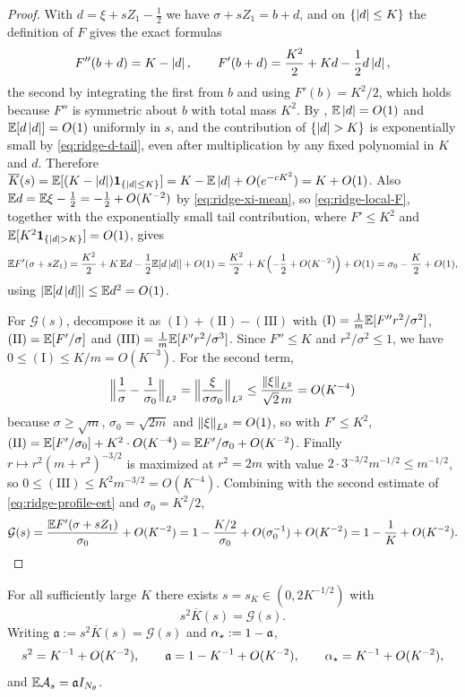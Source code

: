 \begin{proof}
With $d=\xi+sZ_1-\tfrac12$ we have $\sigma+sZ_1=b+d$, and on $\{\left\lvert d\right\rvert\leq K\}$ the definition
of $F$ gives the exact formulas
\begin{equation}
\label{eq:ridge-local-F}
    F''(b+d)=K-\left\lvert d\right\rvert,
    \qquad
    F'(b+d)=\frac{K^2}2+Kd-\frac12d\left\lvert d\right\rvert,
\end{equation}
the second by integrating the first from $b$ and using $F'(b)=K^2/2$, which holds because
$F''$ is symmetric about $b$ with total mass $K^2$. By ,
$\mathbb{E}\left\lvert d\right\rvert=O(1)$ and $\mathbb{E}[d\left\lvert d\right\rvert]=O(1)$ uniformly in $s$, and the contribution of
$\{\left\lvert d\right\rvert>K\}$ is exponentially small by \eqref{eq:ridge-d-tail}, even after multiplication by
any fixed polynomial in $K$ and $d$. Therefore
$\overline K(s)=\mathbb{E}[(K-\left\lvert d\right\rvert)\mathbf 1_{\{\left\lvert d\right\rvert\leq K\}}]=K-\mathbb{E}\left\lvert d\right\rvert+O(e^{-cK^2})=K+O(1)$. Also
$\mathbb{E} d=\mathbb{E}\xi-\tfrac12=-\tfrac12+O(K^{-2})$ by \eqref{eq:ridge-xi-mean}, so
\eqref{eq:ridge-local-F}, together with the exponentially small tail contribution, where
$F'\leq K^2$ and $\mathbb{E}[K^2\mathbf 1_{\{\left\lvert d\right\rvert>K\}}]=O(1)$, gives
\[
    \mathbb{E} F'(\sigma+sZ_1)
    =\frac{K^2}2+K\,\mathbb{E} d-\frac12\mathbb{E}[d\left\lvert d\right\rvert]+O(1)
    =\frac{K^2}2+K\Bigl(-\frac12+O(K^{-2})\Bigr)+O(1)
    =\sigma_0-\frac K2+O(1),
\]
using $\left\lvert \mathbb{E}[d\left\lvert d\right\rvert]\right\rvert\leq\mathbb{E} d^2=O(1)$.

For $\mathcal G(s)$, decompose it as $(\mathrm I)+(\mathrm{II})-(\mathrm{III})$ with
$(\mathrm I)=\tfrac1m\mathbb{E}[F''r^2/\sigma^2]$, $(\mathrm{II})=\mathbb{E}[F'/\sigma]$ and
$(\mathrm{III})=\tfrac1m\mathbb{E}[F'r^2/\sigma^3]$. Since $F''\leq K$ and $r^2/\sigma^2\leq1$, we have
$0\leq(\mathrm I)\leq K/m=O(K^{-3})$. For the second term,
\[
    \Bigl\|\frac1\sigma-\frac1{\sigma_0}\Bigr\|_{L^2}
    =\Bigl\|\frac\xi{\sigma\sigma_0}\Bigr\|_{L^2}
    \leq\frac{\left\lVert \xi\right\rVert_{L^2}}{\sqrt2\,m}=O(K^{-4})
\]
because $\sigma\geq\sqrt m$, $\sigma_0=\sqrt{2m}$ and $\left\lVert \xi\right\rVert_{L^2}=O(1)$, so with
$F'\leq K^2$,
$(\mathrm{II})=\mathbb{E}[F'/\sigma_0]+K^2\cdot O(K^{-4})=\mathbb{E} F'/\sigma_0+O(K^{-2})$. Finally
$r\mapsto r^2(m+r^2)^{-3/2}$ is maximized at $r^2=2m$ with value
$2\cdot3^{-3/2}m^{-1/2}\leq m^{-1/2}$, so $0\leq(\mathrm{III})\leq K^2m^{-3/2}=O(K^{-4})$.
Combining with the second estimate of \eqref{eq:ridge-profile-est} and $\sigma_0=K^2/2$,
\[
    \mathcal G(s)=\frac{\mathbb{E} F'(\sigma+sZ_1)}{\sigma_0}+O(K^{-2})
    =1-\frac{K/2}{\sigma_0}+O(\sigma_0^{-1})+O(K^{-2})
    =1-\frac1K+O(K^{-2}).\qedhere
\]
\end{proof}

\begin{lemma}
\label{lem:ridge-tuning}
For all sufficiently large $K$ there exists $s=s_K\in(0,2K^{-1/2})$ with
\begin{equation}
\label{eq:ridge-tuning}
    s^2\overline K(s)=\mathcal G(s).
\end{equation}
Writing $\mathfrak a:=s^2\overline K(s)=\mathcal G(s)$ and $\alpha_\star:=1-\mathfrak a$,
\begin{equation}
\label{eq:ridge-tuning-est}
    s^2=K^{-1}+O(K^{-2}),
    \qquad
    \mathfrak a=1-K^{-1}+O(K^{-2}),
    \qquad
    \alpha_\star=K^{-1}+O(K^{-2}),
\end{equation}
and $\mathbb{E}\mathcal A_s=\mathfrak aI_{N_\theta}$.
\end{lemma}

